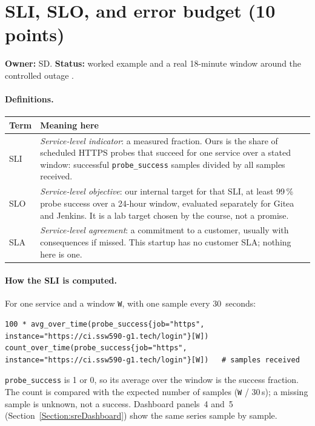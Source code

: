 \section{SLI, SLO, and error budget (10 points)}\label{Section:sreSlo}
\textbf{Owner:} SD. \textbf{Status:} worked example and a real 18-minute window around the controlled outage \StatusPass.

\paragraph{Definitions.}
\begin{tabularx}{\linewidth}{L{1.4cm}Y}
\toprule \textbf{Term} & \textbf{Meaning here}\\ \midrule
SLI & \emph{Service-level indicator}: a measured fraction. Ours is the share of scheduled HTTPS probes that succeed for one service over a stated window: successful \texttt{probe\_success} samples divided by all samples received.\\
SLO & \emph{Service-level objective}: our internal target for that SLI, at least 99\,\% probe success over a 24-hour window, evaluated separately for Gitea and Jenkins. It is a lab target chosen by the course, not a promise.\\
SLA & \emph{Service-level agreement}: a commitment to a customer, usually with consequences if missed. This startup has no customer SLA; nothing here is one.\\ \bottomrule
\end{tabularx}
\paragraph{How the SLI is computed.} For one service and a window \texttt{W}, with one sample every 30~seconds:
\begin{verbatim}
100 * avg_over_time(probe_success{job="https", instance="https://ci.ssw590-g1.tech/login"}[W])
count_over_time(probe_success{job="https", instance="https://ci.ssw590-g1.tech/login"}[W])   # samples received
\end{verbatim}
\texttt{probe\_success} is 1 or 0, so its average over the window is the success fraction. The count is compared with the
expected number of samples (\texttt{W} / 30\,s); a missing sample is unknown, not a success. Dashboard panels~4 and~5
(Section~\ref{Section:sreDashboard}) show the same series sample by sample.

